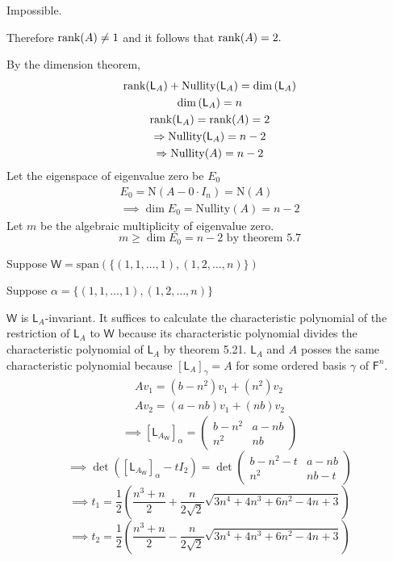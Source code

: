 Impossible.

Therefore $\text{rank}({A}) \neq 1$ and it follows that $\text{rank}({A}) = 2.$

By the dimension theorem,
\begin{gather}
\text{rank}({\mathsf{L}_A}) + \text{Nullity}(\mathsf{L}_A) =
\dim{(\mathsf{L}_A)}\\
\dim{(\mathsf{L}_A)} = n\\
\text{rank}({\mathsf{L}_A}) = \text{rank}({A}) = 2\\
\Rightarrow \text{Nullity}(\mathsf{L}_A) = n -2\\
\Rightarrow \text{Nullity}(A) = n-2
\end{gather}
Let the eigenspace of eigenvalue zero be $E_0$
\begin{gather}
E_0 = \text{N}(A - 0 \cdot I_n) = \text{N}(A)\\
\implies \dim{E_0} = \text{Nullity}(A) = n-2
\end{gather}
Let $m$ be the algebraic multiplicity of eigenvalue zero.
\begin{equation}
m \geq \dim{E_0} = n - 2 \text{ by theorem 5.7}
\end{equation}

Suppose $\mathsf{W} = \text{span}(\{(1,1,\dotsc,1),(1,2,\dotsc,n)\})$

Suppose $\alpha = \{(1,1,\dotsc,1),(1,2,\dotsc,n)\}$ 

$\mathsf{W}$ is $\mathsf{L}_A$-invariant. It suffices to calculate the
characteristic polynomial of the restriction of $\mathsf{L}_A$ to
$\mathsf{W}$ because its characteristic polynomial divides the
characteristic polynomial of $\mathsf{L}_A$ by theorem
5.21. $\mathsf{L}_A$ and $A$ posses the same characteristic polynomial
because $\left[\mathsf{L}_A\right]_\gamma = A$ for some ordered basis
$\gamma$ of $\mathsf{F}^n$.
\begin{gather}
Av_1 = (b-n^2)v_1 + (n^2)v_2\\
Av_2 = (a-nb)v_1 + (nb)v_2
\end{gather}
\begin{equation}
\implies \left[\mathsf{L}_{A_\mathsf{W}}\right]_\alpha =
\begin{pmatrix}
b-n^2 & a-nb\\
n^2 & nb
\end{pmatrix}
\end{equation}
\begin{equation}
\implies
\det{\left(\left[\mathsf{L}_{A_\mathsf{W}}\right]_\alpha-tI_2\right)}
= \det{\begin{pmatrix}
b-n^2 -t & a-nb\\
n^2 & nb -t
  \end{pmatrix}
}
\end{equation}
\begin{equation}
\implies t_1 = \frac{1}{2}\left(\frac{n^3+n}{2} +
  \frac{n}{2\sqrt{2}}\sqrt{3n^4 +4n^3+6n^2-4n+3}\right)
\end{equation}
\begin{equation}
\implies t_2 = \frac{1}{2}\left(\frac{n^3+n}{2} -
  \frac{n}{2\sqrt{2}}\sqrt{3n^4 +4n^3+6n^2-4n+3}\right)
\end{equation}

